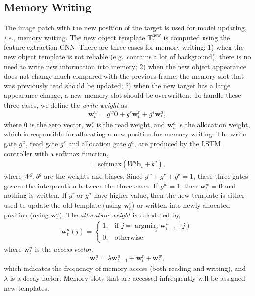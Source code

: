 \documentclass[runningheads]{llncs}
\newcommand{\yty}[1]{\textcolor{black}{#1}}
\begin{document}

\subsection{Memory Writing}

The image patch with the new position of the target is used for model updating, \emph{i.e.}, memory writing.
The new object template $\mathbf{T}^{\text{new}}_t$ is computed using the feature extraction CNN. There are three cases for memory writing: 1) when the new object template is not reliable (e.g.\ contains a lot of background), there is no need to write new information into memory; 2) when the new object appearance does not change much compared with the previous frame, the memory slot that was previously read should be updated; %
3) when the new target has a large appearance change, a new memory slot should be overwritten.
To handle these three cases, we define the \textit{write weight} as
\begin{align}
\mathbf{w}^w_t =g^w\mathbf{0}+g^r\mathbf{w}^r_t + g^a\mathbf{w}^a_t, 
\end{align}
where $\mathbf{0}$ is the zero vector, $\mathbf{w}^r_t$ is the read weight, and $\mathbf{w}^a_t$  is the allocation weight, which is responsible for allocating a new position for memory writing. 
The write gate $g^w$, read gate $g^r$ and allocation gate $g^a$, are produced by the LSTM controller with a softmax function, 
\begin{align}
[g^w, g^r, g^a] = \text{softmax}(W^g \mathbf{h}_{t}+b^g),
\end{align}
where $W^g, b^g$ are the weights and biases. Since $g^w+g^r+g^a=1$, these three gates govern the interpolation between the three cases.  If $g^w=1$, then $\mathbf{w}^w_t=\mathbf{0}$ and nothing is written.  If $g^r$ or $g^a$ have higher value, then the new template is either used to update the old template (using $\mathbf{w}^r_t$) or written into newly allocated position (using $\mathbf{w}^a_t$). The \textit{allocation weight} is calculated by,
\begin{align}
\mathbf{w}^a_t(j)=
\begin{cases}
1, &\text{if } j=\displaystyle \mathop{\mathrm{argmin}}_{j} \mathbf{w}^u_{t-1}(j)\\
0, &\text{otherwise}
\end{cases}
\end{align}
where $\mathbf{w}^u_t$ is the \textit{access vector},
\begin{align}
\mathbf{w}^u_t = \lambda \mathbf{w}^u_{t-1} + \mathbf{w}^r_t + \mathbf{w}^w_t,
\end{align}
which indicates the frequency of memory access (both reading and writing), and $\lambda$ is a decay factor. Memory slots that are accessed infrequently will be assigned new templates.  
\end{document}
